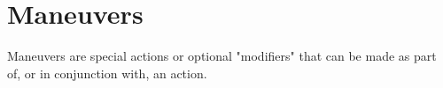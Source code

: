 \closeskillslist



































\section*{Maneuvers}


Maneuvers are special actions or optional "modifiers" that can be made as part of, or in conjunction with, an action.


